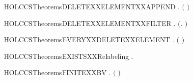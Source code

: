 \newcommand{\HOLCCSTheoremsconameXXCOMPL}{\UseVerbatim{HOLCCSTheoremsconameXXCOMPL}}
\begin{SaveVerbatim}{HOLCCSTheoremsDELETEXXELEMENTXXAPPEND}
\HOLTokenTurnstile{} \HOLSymConst{\HOLTokenForall{}}  .
         \ensuremath{(} \HOLSymConst{++} \ensuremath{)} \HOLSymConst{\ensuremath{=}}
          \HOLSymConst{++}   
\end{SaveVerbatim}
\newcommand{\HOLCCSTheoremsDELETEXXELEMENTXXAPPEND}{\UseVerbatim{HOLCCSTheoremsDELETEXXELEMENTXXAPPEND}}
\begin{SaveVerbatim}{HOLCCSTheoremsDELETEXXELEMENTXXFILTER}
\HOLTokenTurnstile{} \HOLSymConst{\HOLTokenForall{}} .    \HOLSymConst{\ensuremath{=}}  \ensuremath{(}\HOLTokenLambda{}.  \HOLSymConst{\HOLTokenNotEqual{}} \ensuremath{)} 
\end{SaveVerbatim}
\newcommand{\HOLCCSTheoremsDELETEXXELEMENTXXFILTER}{\UseVerbatim{HOLCCSTheoremsDELETEXXELEMENTXXFILTER}}
\begin{SaveVerbatim}{HOLCCSTheoremsEVERYXXDELETEXXELEMENT}
\HOLTokenTurnstile{} \HOLSymConst{\HOLTokenForall{}}  .   \HOLSymConst{\HOLTokenConj{}}   \ensuremath{(}  \ensuremath{)} \HOLSymConst{\HOLTokenImp{}}   
\end{SaveVerbatim}
\newcommand{\HOLCCSTheoremsEVERYXXDELETEXXELEMENT}{\UseVerbatim{HOLCCSTheoremsEVERYXXDELETEXXELEMENT}}
\begin{SaveVerbatim}{HOLCCSTheoremsEXISTSXXRelabeling}
\HOLTokenTurnstile{} \HOLSymConst{\HOLTokenExists{}}.  
\end{SaveVerbatim}
\newcommand{\HOLCCSTheoremsEXISTSXXRelabeling}{\UseVerbatim{HOLCCSTheoremsEXISTSXXRelabeling}}
\begin{SaveVerbatim}{HOLCCSTheoremsFINITEXXBV}
\HOLTokenTurnstile{} \HOLSymConst{\HOLTokenForall{}}.  \ensuremath{(} \ensuremath{)}
\end{SaveVerbatim}
